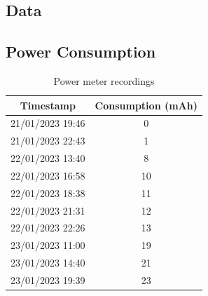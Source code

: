 \begin{appendices}
\begin{landscape}
\chapter{Data}

    \section{Power Consumption}
    \begin{table}[H]
        \centering
        \caption{Power meter recordings}
        \begin{tabular}{|cc|}
            \hline
            Timestamp        & Consumption (mAh) \\
            \hline
            21/01/2023 19:46 & 0                 \\
            21/01/2023 22:43 & 1                 \\
            22/01/2023 13:40 & 8                 \\
            22/01/2023 16:58 & 10                \\
            22/01/2023 18:38 & 11                \\
            22/01/2023 21:31 & 12                \\
            22/01/2023 22:26 & 13                \\
            23/01/2023 11:00 & 19                \\
            23/01/2023 14:40 & 21                \\
            23/01/2023 19:39 & 23                \\
            \hline
        \end{tabular}
        \label{table:powermeter}
    \end{table}


\end{landscape}
\end{appendices}
